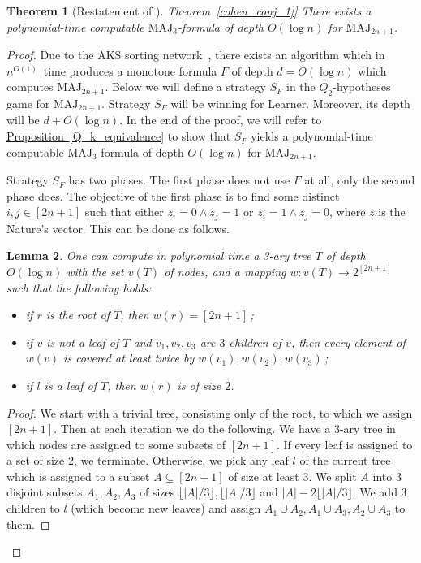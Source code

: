 \documentclass[11pt]{article}
\numberwithin{equation}{section}
\newtheorem{theorem}{Theorem}[section]
\newtheorem{lemma}[theorem]{Lemma}
\theoremstyle{definition}
\theoremstyle{plain}
\newcommand{\expref}[2]{\hyperref[#2]{#1~\ref{#2}}}
\def\MAJ{\mathrm{MAJ}}
\begin{document}
\begin{theorem}[Restatement of \expref{Theorem}{cohen_conj_1}]
\label{cohen_conj_11}
There exists a polynomial-time computable 
%
$\MAJ_3$-formula of depth $O(\log n)$  %
for $\MAJ_{2n + 1}$.
\end{theorem}
\begin{proof}
Due to the AKS sorting network~\cite{AKS83},
there exists an algorithm which in
%
$n^{O(1)}$~time   %
produces a monotone formula $F$ of depth $d = O(\log n)$ which computes $\MAJ_{2n + 1}$. Below we will define a strategy $S_F$  in the $Q_2$-hypotheses game for $\MAJ_{2n + 1}$. Strategy $S_F$ will be winning for Learner. Moreover, its depth will be $d + O(\log n)$. In the end of the proof, we will refer to \expref{Proposition}{Q_k_equivalence} to show that $S_F$ yields 
%
a polynomial-time computable $\MAJ_3$-formula
of depth $O(\log n)$  %
for $\MAJ_{2n + 1}$.

 Strategy $S_F$ has two phases. The first phase does not use $F$ at all, only the second phase does. The objective of the first phase is to find some distinct $i, j\in [2n + 1]$ such that either $z_i = 0 \land z_j = 1$ or $z_i = 1 \land z_j = 0$, where $z$ is the Nature's vector. This can be done as  follows.
\begin{lemma} 
\label{tree_lemma}
One can compute in polynomial time a 3-ary tree $T$ of depth $O(\log n)$ 
with the %
set $v(T)$ of nodes,   %
and a mapping $w\colon v(T) \to 2^{[2n + 1]}$ such that the following holds:
\begin{itemize}
%
\item if $r$ is the root of $T$, then $w(r) = [2n + 1]$\,;  %
\item if $v$ is not a leaf of $T$ and $v_1, v_2, v_3$ are $3$ children of $v$, then every element of $w(v)$ is covered at least twice by $w(v_1), w(v_2), w(v_3)$\,;   %
\item if $l$ is a leaf of $T$, then $w(r)$ is of size $2$.
\end{itemize}
\end{lemma}
\begin{proof}
  We start with a trivial tree, consisting only of the root, to which we assign $[2n + 1]$. Then at each iteration we do the following. We have a $3$-ary tree in which nodes are assigned to some subsets of $[2n + 1]$. If every leaf is assigned to a set of size $2$, we terminate. Otherwise, we pick any leaf $l$ of the current tree which is assigned to a subset $A\subseteq [2n + 1]$ of size at least $3$. We split $A$ into $3$ disjoint subsets $A_1, A_2, A_3$ of sizes $\lfloor |A|/3\rfloor, \lfloor |A|/3 \rfloor$ and $|A| - 2\lfloor |A|/3\rfloor$. We add $3$ children to $l$ (which become new
%
leaves)   %
and assign $A_1\cup A_2, A_1 \cup A_3, A_2 \cup A_3$ to them.


\end{proof}
\end{proof}
\end{document}
